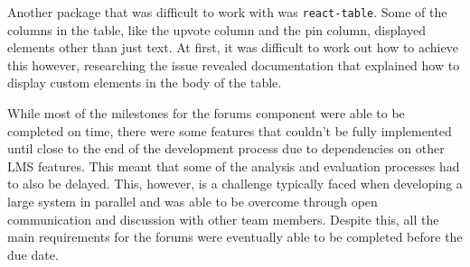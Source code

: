 Another package that was difficult to work with was \texttt{react-table}.
Some of the columns in the table, like the upvote column and the pin column, displayed elements other than just text.
At first, it was difficult to work out how to achieve this however, researching the issue revealed documentation that explained how to display custom elements in the body of the table.

While most of the milestones for the forums component were able to be completed on time, there were some features that couldn't be fully implemented until close to the end of the development process due to dependencies on other LMS features.
This meant that some of the analysis and evaluation processes had to also be delayed.
This, however, is a challenge typically faced when developing a large system in parallel and was able to be overcome through open communication and discussion with other team members.
Despite this, all the main requirements for the forums were eventually able to be completed before the due date.

